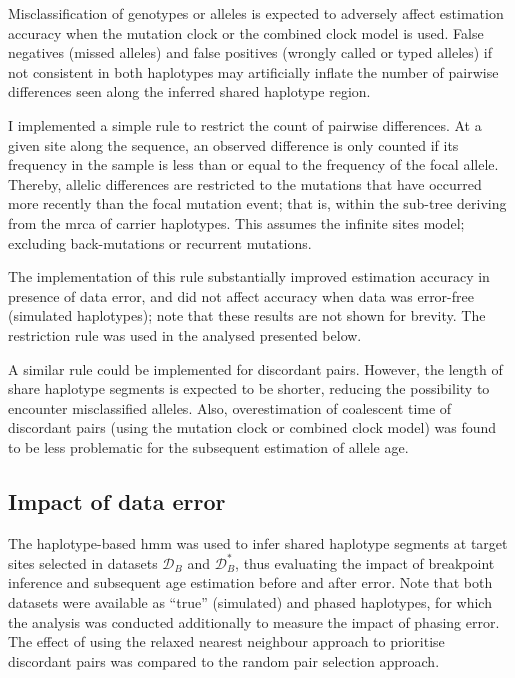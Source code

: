 Misclassification of genotypes or alleles is expected to adversely affect estimation accuracy when the mutation clock or the combined clock model is used.
False negatives (missed alleles) and false positives (wrongly called or typed alleles) if not consistent in both haplotypes may artificially inflate the number of pairwise differences seen along the inferred shared haplotype region.

I implemented a simple rule to restrict the count of pairwise differences.
At a given site along the sequence, an observed difference is only counted if its frequency in the sample is less than or equal to the frequency of the focal allele.
Thereby, allelic differences are restricted to the mutations that have occurred more recently than the focal mutation event; that is, within the sub-tree deriving from the \gls{mrca} of carrier haplotypes.
This assumes the infinite sites model; \ie excluding back-mutations or recurrent mutations.

The implementation of this rule substantially improved estimation accuracy in presence of data error, and did not affect accuracy when data was error-free (simulated haplotypes); note that these results are not shown for brevity.
The restriction rule was used in the analysed presented below.

A similar rule could be implemented for discordant pairs.
However, the length of share haplotype segments is expected to be shorter, reducing the possibility to encounter misclassified alleles.
Also, overestimation of coalescent time of discordant pairs (using the mutation clock or combined clock model) was found to be less problematic for the subsequent estimation of allele age.





%
\subsection{Impact of data error}\label{sec:hhmm_eval}
%

The haplotype-based \gls{hmm} was used to infer shared haplotype segments at target sites selected in datasets $\mathcal{D}_B$ and $\mathcal{D}_B^{\ast}$, thus evaluating the impact of breakpoint inference and subsequent age estimation before and after error.
Note that both datasets were available as ``true'' (simulated) and phased haplotypes, for which the analysis was conducted additionally to measure the impact of phasing error.
The effect of using the relaxed nearest neighbour approach to prioritise discordant pairs was compared to the random pair selection approach.

